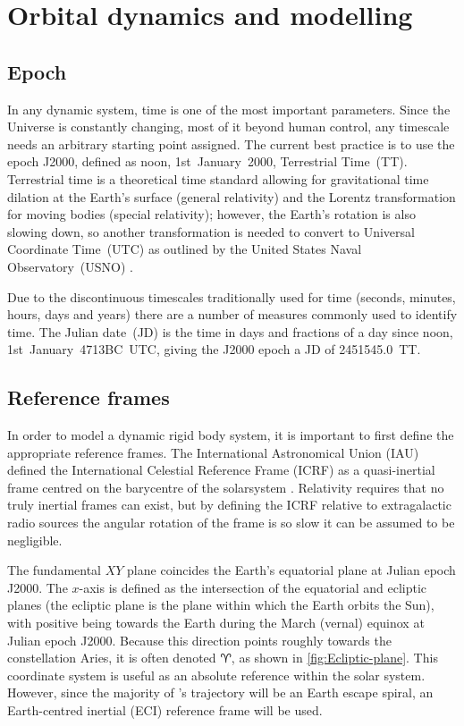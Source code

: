 \chapter{Orbital dynamics and modelling} \label{cha:Orbital-dynamics-and-modelling}

\section{Epoch} \label{sec:Epoch}

In any dynamic system, time is one of the most important parameters. Since the Universe is constantly changing, most of it beyond human control, any timescale needs an arbitrary starting point assigned. The current best practice is to use the epoch J2000, defined as noon, 1st~January~2000, Terrestrial Time~(TT). Terrestrial time is a theoretical time standard allowing for gravitational time dilation at the Earth's surface (general relativity) and the Lorentz transformation for moving bodies (special relativity); however, the Earth's rotation is also slowing down, so another transformation is needed to convert to Universal Coordinate Time~(UTC) as outlined by the United States Naval Observatory~(USNO) \textcite{web_TimeServiceDept.2008}.

Due to the discontinuous timescales traditionally used for time (seconds, minutes, hours, days and years) there are a number of measures commonly used to identify time. The Julian date~(JD) is the time in days and fractions of a day since noon, 1st~January~4713BC~UTC, giving the J2000 epoch a JD of 2451545.0~TT.




\section{Reference frames} \label{sec:Reference-frames}

In order to model a dynamic rigid body system, it is important to first define the appropriate reference frames. The International Astronomical Union (IAU) defined the International Celestial Reference Frame (ICRF) as a quasi-inertial frame centred on the barycentre of the solarsystem \parencite{Montenbruck2000}. %
Relativity requires that no truly inertial frames can exist, but by defining the ICRF relative to extragalactic radio sources the angular rotation of the frame is so slow it can be assumed to be negligible.

The fundamental $XY$ plane coincides the Earth's equatorial plane at Julian epoch J2000. The $x$-axis is defined as the intersection of the equatorial and ecliptic planes (the ecliptic plane is the plane within which the Earth orbits the Sun), with positive being towards the Earth during the March (vernal) equinox at Julian epoch J2000. Because this direction points roughly towards the constellation Aries, it is often denoted $\Aries$, as shown in \autoref{fig:Ecliptic-plane}. This coordinate system is useful as an absolute reference within the solar system. However, since the majority of \BW's trajectory will be an Earth escape spiral, an Earth-centred inertial (ECI) reference frame will be used.


